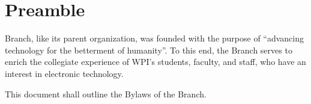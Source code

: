 \chapter*{Preamble}
	\Glsdesc{Branch}, like its parent organization, was founded with the purpose of ``advancing technology for the betterment of humanity''. To this end, the \glsdesc{Branch} serves to enrich the collegiate experience of \acrshort{WPI}'s students, faculty, and staff, who have an interest in electronic technology.

	This document shall outline the \Glspl{Bylaw} of the \glsdesc{Branch}.

	\glsresetall